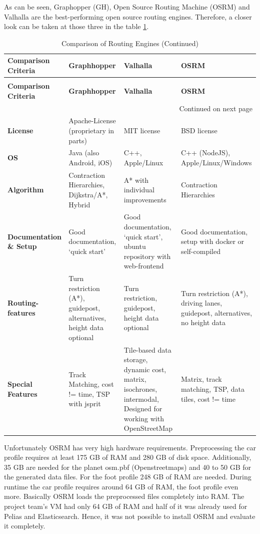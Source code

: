 As can be seen, Graphopper (GH), Open Source Routing Machine (OSRM) and Valhalla are the best-performing open source routing engines. Therefore, a closer look can be taken at those three in the table \ref{CoRE}.
%
\begin{longtable}{|p{3.0cm}|p{3.0cm}|p{3.0cm}|p{3.0cm}|}
\caption{Comparison of Routing Engines \label{CoRE}}\\ \hline
\textbf{Comparison Criteria} & \textbf{Graphhopper} & \textbf{Valhalla} & \textbf{OSRM} \\ \hline
\endfirsthead
\caption{Comparison of Routing Engines (Continued)} \\ \hline
\textbf{Comparison Criteria} & \textbf{Graphhopper} & \textbf{Valhalla} & \textbf{OSRM} \\ \hline
\endhead
\multicolumn{4}{|r|}{Continued on next page}\\ \hline
\endfoot
\hline
%
\endlastfoot
\textbf{License} & Apache-License (proprietary in parts) & MIT license & BSD license \\ \hline
\textbf{OS} & Java (also Android, iOS) & C++, Apple/Linux & C++ (NodeJS), Apple/Linux/Windows \\ \hline
\textbf{Algorithm} & Contraction Hierarchies, Dijkstra/A*, Hybrid & A* with individual improvements & Contraction Hierarchies \\ \hline
\textbf{Documentation \& Setup} & Good documentation, ‘quick start’ & Good documentation, ‘quick start’, ubuntu repository with web-frontend & Good documentation, setup with docker or self-compiled \\ \hline
\textbf{Routing-features} & Turn restriction (A*), guidepost, alternatives, height data optional & Turn restriction, guidepost, height data optional & Turn restriction (A*), driving lanes, guidepost, alternatives, no height data \\ \hline
\textbf{Special Features} & Track Matching, cost != time, TSP with jsprit & Tile-based data storage, dynamic cost, matrix, isochrones, intermodal, Designed for working with OpenStreetMap & Matrix, track matching, TSP, data tiles, cost != time \\ \hline
\end{longtable}




Unfortunately OSRM has very high hardware requirements\citep{J.2017}. Preprocessing the car profile requires at least 175 GB of RAM and 280 GB of disk space. Additionally, 35 GB are needed for the planet osm.pbf (Openstreetmaps) and 40 to 50 GB for the generated data files. For the foot profile 248 GB of RAM are needed. During runtime the car profile requires around 64 GB of RAM, the foot profile even more. Basically OSRM loads the preprocessed files completely into RAM\citep{J.2017}. The project team's VM had only 64 GB of RAM and half of it was already used for Pelias and Elasticsearch. Hence, it was not possible to install OSRM and evaluate it completely.

